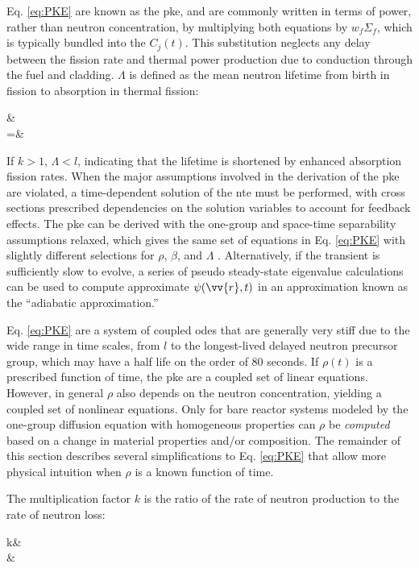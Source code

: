 Eq. \eqref{eq:PKE} are known as the \gls{pke}, and are commonly written in terms of power, rather than neutron concentration, by multiplying both equations by \(w_f\Sigma_f\), which is typically bundled into the \(C_j(t)\). This substitution neglects any delay between the fission rate and thermal power production due to conduction through the fuel and cladding. \(\Lambda\) is defined as the mean neutron lifetime from birth in fission to absorption in thermal fission:

\beqa
\Lambda\equiv&\\
=&
\eeqa

If \(k>1\), \(\Lambda<l\), indicating that the lifetime is shortened by enhanced absorption fission rates. When the major assumptions involved in the derivation of the \gls{pke} are violated, a time-dependent solution of the \gls{nte} must be performed, with cross sections prescribed dependencies on the solution variables to account for feedback effects. The \gls{pke} can be derived with the one-group and space-time separability assumptions relaxed, which gives the same set of equations in Eq. \eqref{eq:PKE} with slightly different selections for \(\rho\), \(\beta\), and \(\Lambda\) \cite{duderstadt}. Alternatively, if the transient is sufficiently slow to evolve, a series of pseudo steady-state eigenvalue calculations can be used to compute approximate \(\psi(\vv{r},t)\) in an approximation known as the ``adiabatic approximation.''

Eq. \eqref{eq:PKE} are a system of coupled \glspl{ode} that are generally very stiff due to the wide range in time scales, from \(l\) to the longest-lived delayed neutron precursor group, which may have a half life on the order of 80 seconds. If \(\rho(t)\) is a prescribed function of time, the \gls{pke} are a coupled set of linear equations. However, in general \(\rho\) also depends on the neutron concentration, yielding a coupled set of nonlinear equations. Only for bare reactor systems modeled by the one-group diffusion equation with homogeneous properties can \(\rho\) be {\it computed} based on a change in material properties and/or composition. The remainder of this section describes several simplifications to Eq. \eqref{eq:PKE} that allow more physical intuition when \(\rho\) is a known function of time.

The multiplication factor \(k\) is the ratio of the rate of neutron production to the rate of neutron loss:

\beqa
\label{eq:KDef}
k\equiv&\\
\equiv&
\eeqa

